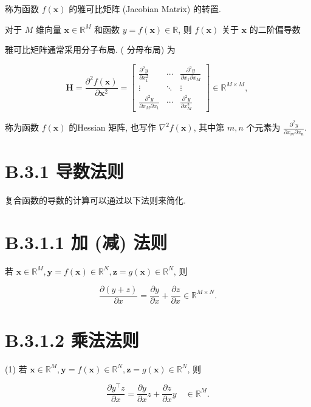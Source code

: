 \documentclass[10pt]{article}
\begin{document}
称为函数 $f(\boldsymbol{x})$ 的雅可比矩阵 (Jacobian Matrix) 的转置.

对于 $M$ 维向量 $\boldsymbol{x} \in \mathbb{R}^{M}$ 和函数 $y=f(\boldsymbol{x}) \in \mathbb{R}$, 则 $f(\boldsymbol{x})$ 关于 $\boldsymbol{x}$ 的二阶偏导数

雅可比矩阵通常采用分子布局. ( 分母布局) 为

\[
\boldsymbol{H}=\frac{\partial^{2} f(\boldsymbol{x})}{\partial \boldsymbol{x}^{2}}=\left[\begin{array}{ccc}
\frac{\partial^{2} y}{\partial x_{1}^{2}} & \cdots & \frac{\partial^{2} y}{\partial x_{1} \partial x_{M}}  \tag{B.11}\\
\vdots & \ddots & \vdots \\
\frac{\partial^{2} y}{\partial x_{M} \partial x_{1}} & \cdots & \frac{\partial^{2} y}{\partial x_{M}^{2}}
\end{array}\right] \in \mathbb{R}^{M \times M} \text {, }
\]

称为函数 $f(\boldsymbol{x})$ 的Hessian 矩阵, 也写作 $\nabla^{2} f(\boldsymbol{x})$, 其中第 $m, n$ 个元素为 $\frac{\partial^{2} y}{\partial x_{m} \partial x_{n}}$.

\section*{B.3.1 导数法则}
复合函数的导数的计算可以通过以下法则来简化.

\section*{B.3.1.1 加 (减) 法则}
若 $\boldsymbol{x} \in \mathbb{R}^{M}, \boldsymbol{y}=f(\boldsymbol{x}) \in \mathbb{R}^{N}, \boldsymbol{z}=g(\boldsymbol{x}) \in \mathbb{R}^{N}$, 则


\begin{equation*}
\frac{\partial(y+z)}{\partial x}=\frac{\partial y}{\partial x}+\frac{\partial z}{\partial x} \in \mathbb{R}^{M \times N} . \tag{B.12}
\end{equation*}


\section*{B.3.1.2 乘法法则}
(1) 若 $\boldsymbol{x} \in \mathbb{R}^{M}, \boldsymbol{y}=f(\boldsymbol{x}) \in \mathbb{R}^{N}, \boldsymbol{z}=g(\boldsymbol{x}) \in \mathbb{R}^{N}$, 则


\begin{equation*}
\frac{\partial y^{\top} z}{\partial x}=\frac{\partial y}{\partial x} z+\frac{\partial z}{\partial x} y \quad \in \mathbb{R}^{M} . \tag{B.13}
\end{equation*}
\end{document}
